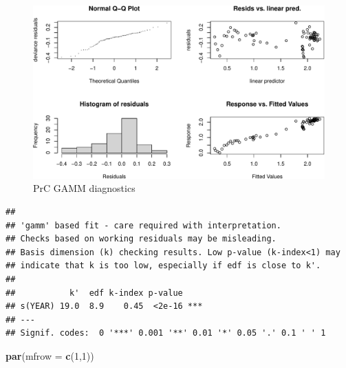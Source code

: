 \documentclass[nofonts,]{tufte-handout}
\newenvironment{Shaded}{\begin{snugshade}}{\end{snugshade}}
\newcommand{\AttributeTok}[1]{\textcolor[rgb]{0.13,0.29,0.53}{#1}}
\newcommand{\DecValTok}[1]{\textcolor[rgb]{0.00,0.00,0.81}{#1}}
\newcommand{\FunctionTok}[1]{\textcolor[rgb]{0.13,0.29,0.53}{\textbf{#1}}}
\newcommand{\NormalTok}[1]{#1}
\newcommand{\OtherTok}[1]{\textcolor[rgb]{0.56,0.35,0.01}{#1}}
\newcommand{\SpecialCharTok}[1]{\textcolor[rgb]{0.81,0.36,0.00}{\textbf{#1}}}
\newcommand{\StringTok}[1]{\textcolor[rgb]{0.31,0.60,0.02}{#1}}
\begin{document}
\begin{figure}
\includegraphics{Technical-supplement_files/figure-latex/gamprc-1} \caption[PrC GAMM diagnostics]{PrC GAMM diagnostics}\label{fig:gamprc}
\end{figure}

\begin{verbatim}
## 
## 'gamm' based fit - care required with interpretation.
## Checks based on working residuals may be misleading.
## Basis dimension (k) checking results. Low p-value (k-index<1) may
## indicate that k is too low, especially if edf is close to k'.
## 
##           k'  edf k-index p-value    
## s(YEAR) 19.0  8.9    0.45  <2e-16 ***
## ---
## Signif. codes:  0 '***' 0.001 '**' 0.01 '*' 0.05 '.' 0.1 ' ' 1
\end{verbatim}

\begin{Shaded}
\begin{Highlighting}[]
\FunctionTok{par}\NormalTok{(}\AttributeTok{mfrow =} \FunctionTok{c}\NormalTok{(}\DecValTok{1}\NormalTok{,}\DecValTok{1}\NormalTok{))}
\end{Highlighting}
\end{Shaded}

\begin{Shaded}
\end{Shaded}
\end{document}

